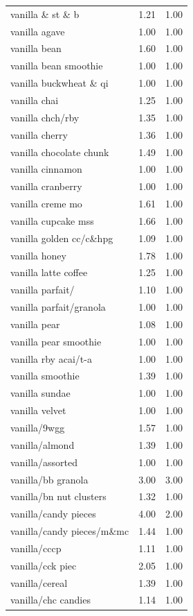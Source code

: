 \begin{table}
\begin{tabular}{lrr}
vanilla \& st \& b & 1.21 & 1.00 \\
vanilla agave & 1.00 & 1.00 \\
vanilla bean & 1.60 & 1.00 \\
vanilla bean smoothie & 1.00 & 1.00 \\
vanilla buckwheat \& qi & 1.00 & 1.00 \\
vanilla chai & 1.25 & 1.00 \\
vanilla chch/rby & 1.35 & 1.00 \\
vanilla cherry & 1.36 & 1.00 \\
vanilla chocolate chunk & 1.49 & 1.00 \\
vanilla cinnamon & 1.00 & 1.00 \\
vanilla cranberry & 1.00 & 1.00 \\
vanilla creme mo & 1.61 & 1.00 \\
vanilla cupcake mss & 1.66 & 1.00 \\
vanilla golden cc/c\&hpg & 1.09 & 1.00 \\
vanilla honey & 1.78 & 1.00 \\
vanilla latte coffee & 1.25 & 1.00 \\
vanilla parfait/ & 1.10 & 1.00 \\
vanilla parfait/granola & 1.00 & 1.00 \\
vanilla pear & 1.08 & 1.00 \\
vanilla pear smoothie & 1.00 & 1.00 \\
vanilla rby acai/t-a & 1.00 & 1.00 \\
vanilla smoothie & 1.39 & 1.00 \\
vanilla sundae & 1.00 & 1.00 \\
vanilla velvet & 1.00 & 1.00 \\
vanilla/9wgg & 1.57 & 1.00 \\
vanilla/almond & 1.39 & 1.00 \\
vanilla/assorted & 1.00 & 1.00 \\
vanilla/bb granola & 3.00 & 3.00 \\
vanilla/bn nut clusters & 1.32 & 1.00 \\
vanilla/candy pieces & 4.00 & 2.00 \\
vanilla/candy pieces/m\&mc & 1.44 & 1.00 \\
vanilla/cccp & 1.11 & 1.00 \\
vanilla/cck piec & 2.05 & 1.00 \\
vanilla/cereal & 1.39 & 1.00 \\
vanilla/chc candies & 1.14 & 1.00 \\

\end{tabular}
\end{table}
